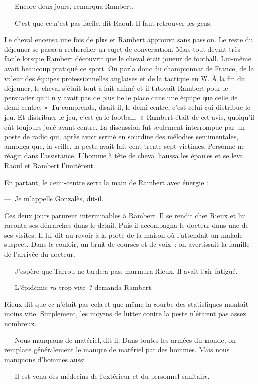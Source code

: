 \documentclass[french,twoside]{book} %
\begin{document}
— Encore deux jours, remarqua Rambert.\par
— C’est que ce n’est pas facile, dit Raoul. Il faut retrouver les gens.\par
Le cheval encensa une fois de plus et Rambert approuva sans passion. Le reste du déjeuner se passa à rechercher un sujet de conversation. Mais tout devint très facile lorsque Rambert découvrit que le cheval était joueur de football. Lui-même avait beaucoup pratiqué ce sport. On parla donc du championnat de France, de la valeur des équipes professionnelles anglaises et de la tactique en W. À la fin du déjeuner, le cheval s’était tout à fait animé et il tutoyait Rambert pour le persuader qu’il n’y avait pas de plus belle place dans une équipe que celle de demi-centre. « Tu comprends, disait-il, le demi-centre, c’est celui qui distribue le jeu. Et distribuer le jeu, c’est ça le football. » Rambert était de cet avis, quoiqu’il eût toujours joué avant-centre. La discussion fut seulement interrompue par un poste de radio qui, après avoir seriné en sourdine des mélodies sentimentales, annonça que, la veille, la peste avait fait cent trente-sept victimes. Personne ne réagit dans l’assistance. L’homme à tête de cheval haussa les épaules et se leva. Raoul et Rambert l’imitèrent.\par
En partant, le demi-centre serra la main de Rambert avec énergie :\par
— Je m’appelle Gonzalès, dit-il.\par
Ces deux jours parurent interminables à Rambert. Il se rendit chez Rieux et lui raconta ses démarches dans le détail. Puis il accompagna le docteur dans une de ses visites. Il lui dit au revoir à la porte de la maison où l’attendait un malade suspect. Dans le couloir, un bruit de courses et de voix : on avertissait la famille de l’arrivée du docteur.\par
— J’espère que Tarrou ne tardera pas, murmura Rieux. Il avait l’air fatigué.\par
— L’épidémie va trop vite ? demanda Rambert.\par
Rieux dit que ce n’était pas cela et que même la courbe des statistiques montait moins vite. Simplement, les moyens de lutter contre la peste n’étaient pas assez nombreux.\par
— Nous manquons de matériel, dit-il. Dans toutes les armées du monde, on remplace généralement le manque de matériel par des hommes. Mais nous manquons d’hommes aussi.\par
— Il est venu des médecins de l’extérieur et du personnel sanitaire.\par
\end{document}
